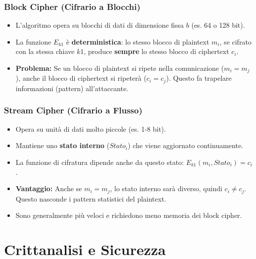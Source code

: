 \documentclass[../main.tex]{subfiles}
\begin{document}
\subsubsection{Block Cipher (Cifrario a Blocchi)}
\begin{itemize}
    \item L'algoritmo opera su blocchi di dati di dimensione fissa $b$ (es. 64 o 128 bit).
    \item La funzione $E_{k1}$ è \textbf{deterministica}: lo stesso blocco di plaintext $m_i$, se cifrato con la stessa chiave $k1$, produce \textbf{sempre} lo stesso blocco di ciphertext $c_i$.
    \item \textbf{Problema:} Se un blocco di plaintext si ripete nella comunicazione ($m_i = m_j$), anche il blocco di ciphertext si ripeterà ($c_i = c_j$). Questo fa trapelare informazioni (pattern) all'attaccante.
\end{itemize}


\subsubsection{Stream Cipher (Cifrario a Flusso)}
\begin{itemize}
    \item Opera su unità di dati molto piccole (es. 1-8 bit).
    \item Mantiene uno \textbf{stato interno} ($Stato_i$) che viene aggiornato continuamente.
    \item La funzione di cifratura dipende anche da questo stato: $E_{k1}(m_i, Stato_i) = c_i$.
    \item \textbf{Vantaggio:} Anche se $m_i = m_j$, lo stato interno sarà diverso, quindi $c_i \neq c_j$. Questo nasconde i pattern statistici del plaintext.
    \item Sono generalmente più veloci e richiedono meno memoria dei block cipher.
\end{itemize}


\section{Crittanalisi e Sicurezza}
\end{document}
